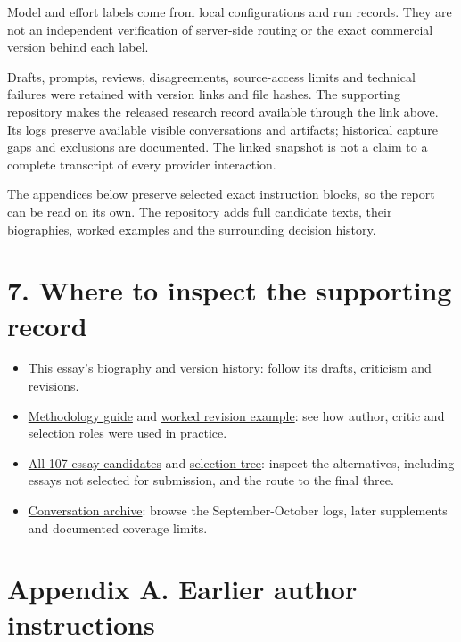 Model and effort labels come from local configurations and run records. They are not an independent verification of server-side routing or the exact commercial version behind each label.

Drafts, prompts, reviews, disagreements, source-access limits and technical failures were retained with version links and file hashes. The supporting repository makes the released research record available through the link above. Its logs preserve available visible conversations and artifacts; historical capture gaps and exclusions are documented. The linked snapshot is not a claim to a complete transcript of every provider interaction.

The appendices below preserve selected exact instruction blocks, so the report can be read on its own. The repository adds full candidate texts, their biographies, worked examples and the surrounding decision history.

\section*{7. Where to inspect the supporting record}

\begin{itemize}
\item \href{https://anonymous.4open.science/r/philosophy-lab-public-D1C2/essays/E051/README.md}{This essay's biography and version history}: follow its drafts, criticism and revisions.
\item \href{https://anonymous.4open.science/r/philosophy-lab-public-D1C2/docs/method.md}{Methodology guide} and \href{https://anonymous.4open.science/r/philosophy-lab-public-D1C2/docs/worked-example.md}{worked revision example}: see how author, critic and selection roles were used in practice.
\item \href{https://anonymous.4open.science/r/philosophy-lab-public-D1C2/essays/topics.md}{All 107 essay candidates} and \href{https://anonymous.4open.science/r/philosophy-lab-public-D1C2/docs/selection-tree.md}{selection tree}: inspect the alternatives, including essays not selected for submission, and the route to the final three.
\item \href{https://anonymous.4open.science/r/philosophy-lab-public-D1C2/logs/README.md}{Conversation archive}: browse the September-October logs, later supplements and documented coverage limits.
\end{itemize}

\clearpage\begingroup\fontsize{10}{12.5}\selectfont\setlength{\parskip}{0.22em}\section*{Appendix A. Earlier author instructions}

